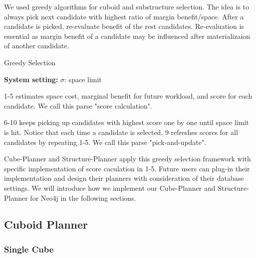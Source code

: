 We used greedy algorithms for cuboid and substructure selection. The idea is to always pick next candidate with highest ratio of margin benefit/space. After a candidate is picked, re-evaluate benefit of the rest candidates. Re-evaluation is essential as margin benefit of a candidate may be influenced after materializaion of another candidate.


\begin{algorithm}[H]
	\caption{Greedy Selection}
	\LinesNumbered  
	\textbf{System setting:} $\sigma$: space limit\\ 
	
\end{algorithm}

1-5 estimates space cost, marginal benefit for future workload, and score for each candidate. We call this parse  "score calculation".

6-10 keeps picking up candidates with highest score one by one until space limit is hit. Notice that each time a candidate is selected, 9 refreshes scores for all candidates by repeating 1-5. We call this parse "pick-and-update".   

Cube-Planner and Structure-Planner apply this greedy selection framework with specific implementation of score caculation in 1-5. Future users can plug-in their implementation and design their planners with consideration of their database settings. We will introduce how we implement our Cube-Planner and Structure-Planner for Neo4j in the following sections.
 
\subsection{Cuboid Planner}

\subsubsection{Single Cube}

